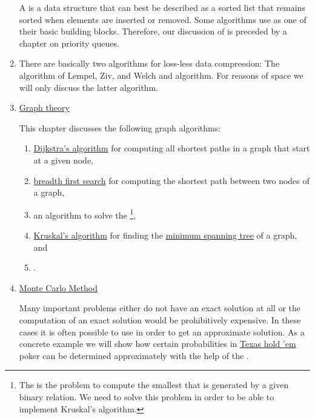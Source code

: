\begin{enumerate}
      A  is a data structure that can best be described as a sorted list that remains
      sorted when elements are inserted or removed.
      Some  algorithms use  as one of their basic building blocks.
      Therefore, our discussion of  is preceded by a chapter on priority queues.
\item {}

      There are basically two algorithms for loss-less data compression: The algorithm of Lempel, Ziv, and
      Welch and  algorithm.  For reasons of space we will only discuss the latter algorithm.
\item \href{http://en.wikipedia.org/wiki/Graph_theory}{Graph theory}
  
      This chapter discusses the following graph algorithms:
      \begin{enumerate}
      \item \href{http://en.wikipedia.org/wiki/Dijkstra%27s_algorithm}{Dijkstra's algorithm}
            for computing all shortest paths in a graph that start at a given node,
      \item \href{http://en.wikipedia.org/wiki/breadth_first_search}{breadth first search} for computing
            the shortest path between two nodes of a graph,           
      \item an algorithm to solve the \footnote{
              The  is the problem to compute the smallest 
              that is generated by a given binary relation. We need to solve this problem in order to be able
              to implement Kruskal's algorithm.
            },
      \item \href{https://en.wikipedia.org/wiki/Kruskal%27s_algorithm}{Kruskal's algorithm} for finding the
            \href{https://en.wikipedia.org/wiki/Minimum_spanning_tree}{minimum spanning tree} of a graph, and
      \item {}.
      \end{enumerate}
\item \href{http://en.wikipedia.org/wiki/Monte_Carlo_method}{Monte Carlo Method} 
 
      Many important problems either do not have an exact solution at all or the computation of an
      exact solution would be prohibitively expensive.  In these cases it is often possible to use 
       in order to get an approximate solution.  As a concrete example we will show
      how certain probabilities in \href{http://en.wikipedia.org/wiki/Texas_hold_%27em}{Texas hold 'em} 
      poker can be determined approximately with the help of the .
\end{enumerate}
